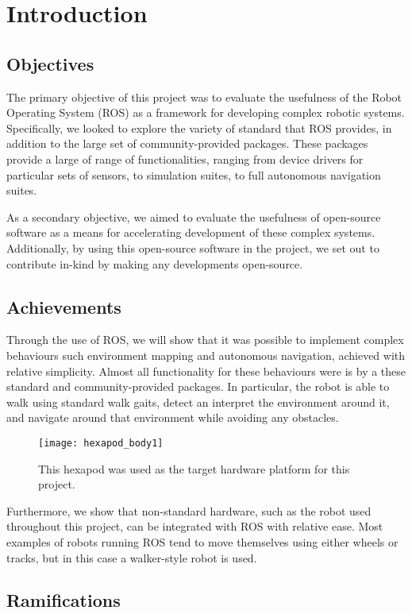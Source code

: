 \chapter{Introduction}


\section{Objectives}

The primary objective of this project was to evaluate the usefulness of the Robot Operating System (ROS) \cite{ros_site} as a framework for developing complex robotic systems. Specifically, we looked to explore the variety of standard that ROS provides, in addition to the large set of community-provided packages. These packages provide a large of range of functionalities, ranging from device drivers for particular sets of sensors, to simulation suites, to full autonomous navigation suites.

As a secondary objective, we aimed to evaluate the usefulness of open-source software as a means for accelerating development of these complex systems. Additionally, by using this open-source software in the project, we set out to contribute in-kind by making any developments open-source.


\section{Achievements}
Through the use of ROS, we will show that it was possible to implement complex behaviours such environment mapping and autonomous navigation, achieved with relative simplicity. Almost all functionality for these behaviours were is by a these standard and community-provided packages. In particular, the robot is able to walk using standard walk gaits, detect an interpret the environment around it, and navigate around that environment while avoiding any obstacles.

\begin{figure}[!h]
    \centering
    \texttt{[image: hexapod\_body1]}
    \caption{This hexapod was used as the target hardware platform for this project.}
\end{figure}

Furthermore, we show that non-standard hardware, such as the robot used throughout this project, can be integrated with ROS with relative ease. Most examples of robots running ROS tend to move themselves using either wheels or tracks, but in this case a walker-style robot is used.


\section{Ramifications}